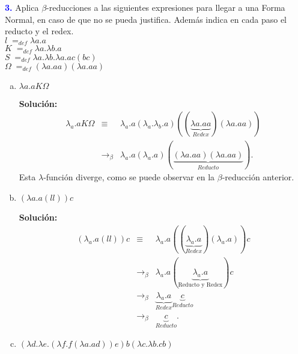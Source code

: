 \textbf{\textcolor{blue}{3.}} \Large
Aplica $\beta$-reducciones a las siguientes expresiones
para llegar a una Forma Normal, en caso de que no se pueda justifica. Además indica
en cada paso el reducto y el redex.\\

$l\;=_{def} \lambda a.a$\\
$K\;=_{def} \lambda a.\lambda b.a$\\
$S\;=_{def} \lambda a.\lambda b.\lambda a.ac(bc)$\\
$\Omega\; =_{def} (\lambda a.aa) (\lambda a.aa)$

\begin{enumerate}[a)]
    \item $\lambda a.aK\Omega$

    \textbf{Solución:}
    \begin{eqnarray*}
        \lambda_a .aK\Omega &\equiv& \lambda_a .a
        (\lambda_a . \lambda_b . a)
        ((\underbrace{\lambda a.aa}_{Redex}) (\lambda a.aa))\\
        &\rightarrow_{\beta}&
        \lambda_a .a (\lambda_a .a)(\underbrace{(\lambda a.aa) (\lambda a.aa)}_{Reducto}).
    \end{eqnarray*}
    Esta $\lambda$-función diverge, como se puede observar en la $\beta$-reducción anterior.
    \item $(\lambda a.a(ll))c$

    \textbf{Solución:}
    \begin{eqnarray*}
        (\lambda_a .a(ll))c &\equiv& \lambda_a . a((\underbrace{\lambda_a .a}_{Redex})
        (\lambda_a .a))c\\
        &\rightarrow_{\beta}& \lambda_a .
        a(\underbrace{\lambda_a .a}_{\text{Reducto y Redex}})c\\
        &\rightarrow_{\beta}& \underbrace{\lambda_a . a}_{Redex} \underbrace{c}_{Reducto}\\
        &\rightarrow_{\beta}& \underbrace{c}_{Reducto}.
    \end{eqnarray*}
    \item $(\lambda d.\lambda e.(\lambda f.f(\lambda a.ad))e)b(\lambda c.\lambda b.cb)$


\end{enumerate}
